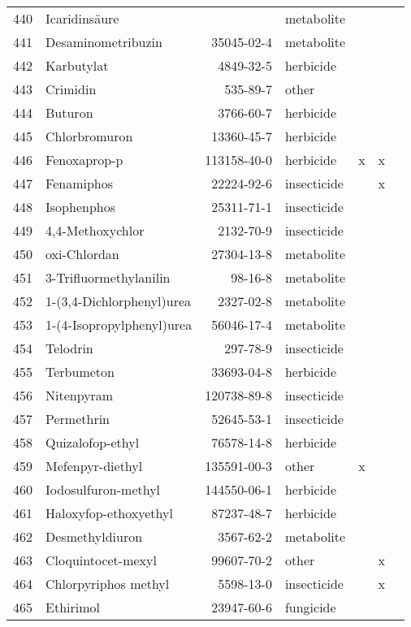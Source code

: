 \begin{longtable}{lp{3cm}rlp{0.5cm}p{0.5cm}p{1cm}}
  440 & Icaridinsäure &  & metabolite &  &  &  \\ 
  441 & Desaminometribuzin & 35045-02-4 & metabolite &  &  &  \\ 
  442 & Karbutylat & 4849-32-5 & herbicide &  &  &  \\ 
  443 & Crimidin & 535-89-7 & other &  &  &  \\ 
  444 & Buturon & 3766-60-7 & herbicide &  &  &  \\ 
  445 & Chlorbromuron & 13360-45-7 & herbicide &  &  &  \\ 
  446 & Fenoxaprop-p & 113158-40-0 & herbicide & x & x &  \\ 
  447 & Fenamiphos & 22224-92-6 & insecticide &  & x &  \\ 
  448 & Isophenphos & 25311-71-1 & insecticide &  &  &  \\ 
  449 & 4,4-Methoxychlor & 2132-70-9 & insecticide &  &  &  \\ 
  450 & oxi-Chlordan & 27304-13-8 & metabolite &  &  &  \\ 
  451 & 3-Trifluormethylanilin & 98-16-8 & metabolite &  &  &  \\ 
  452 & 1-(3,4-Dichlorphenyl)urea & 2327-02-8 & metabolite &  &  &  \\ 
  453 & 1-(4-Isopropylphenyl)urea & 56046-17-4 & metabolite &  &  &  \\ 
  454 & Telodrin & 297-78-9 & insecticide &  &  &  \\ 
  455 & Terbumeton & 33693-04-8 & herbicide &  &  &  \\ 
  456 & Nitenpyram & 120738-89-8 & insecticide &  &  &  \\ 
  457 & Permethrin & 52645-53-1 & insecticide &  &  &  \\ 
  458 & Quizalofop-ethyl & 76578-14-8 & herbicide &  &  &  \\ 
  459 & Mefenpyr-diethyl & 135591-00-3 & other & x &  &  \\ 
  460 & Iodosulfuron-methyl & 144550-06-1 & herbicide &  &  &  \\ 
  461 & Haloxyfop-ethoxyethyl & 87237-48-7 & herbicide &  &  &  \\ 
  462 & Desmethyldiuron & 3567-62-2 & metabolite &  &  &  \\ 
  463 & Cloquintocet-mexyl & 99607-70-2 & other &  & x &  \\ 
  464 & Chlorpyriphos methyl & 5598-13-0 & insecticide &  & x &  \\ 
  465 & Ethirimol & 23947-60-6 & fungicide &  &  &  \\ 

\end{longtable}
